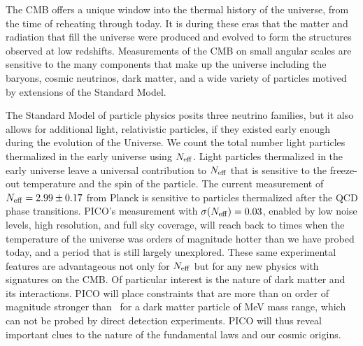 \documentclass[PICOReport.tex]{subfiles}
\begin{document}
The CMB offers a unique window into the thermal history of the universe, from the time of reheating through today.  It is during these eras that the matter and radiation that fill the universe were produced and evolved to form the structures observed at low redshifts.  Measurements of the CMB on small angular scales are sensitive to the many components that make up the universe including the baryons, cosmic neutrinos, dark matter, and a wide variety of particles motived by extensions of the Standard Model.  

The Standard Model of particle physics posits three neutrino families, but it also allows for additional light, relativistic particles, if they existed early enough during the evolution of the Universe.   We count the total number light particles thermalized in the early universe using ${N_{\rm eff}}$. Light particles thermalized in the early universe leave a universal contribution to ${N_{\rm eff}}$ that is sensitive to the freeze-out temperature and the spin of the particle.  
The current measurement of ${N_{\rm eff}} = 2.99 \pm 0.17$  from Planck is sensitive to particles thermalized after the QCD phase transitions. PICO's measurement with $\sigma({N_{\rm eff}})=0.03$, enabled by low noise levels, high resolution, and full sky coverage, will reach back to times when the temperature of the universe was orders of magnitude hotter than we have probed today, and a period that is still largely unexplored.   
These same experimental features are advantageous not only for ${N_{\rm eff}}$ but for any new physics with signatures on the CMB. Of particular interest is the nature of dark matter and its interactions. PICO will place constraints that are more than on order of magnitude stronger than \planck\ for a dark matter particle of MeV mass range, which can not be probed by direct detection experiments. PICO will thus reveal important clues to the nature of the fundamental laws and our cosmic origins. 


\end{document}
